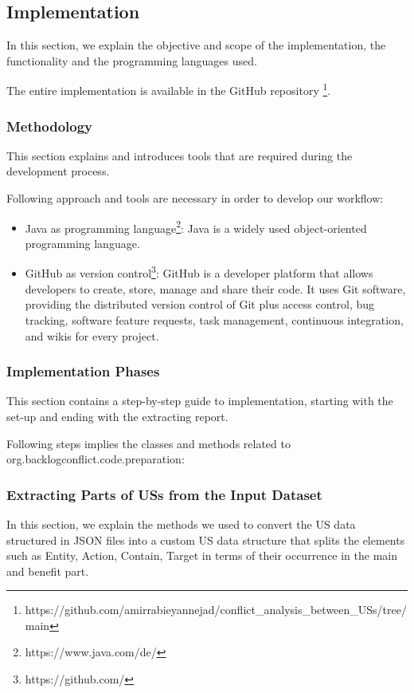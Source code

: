 \subsection{Implementation}\label{conflict_implementation}
In this section, we explain the objective and scope of the implementation, the functionality and the programming languages used.

The entire implementation is available in the GitHub repository \footnote{https://github.com/amirrabieyannejad/conflict\_analysis\_between\_USs/tree/main}.
\subsubsection*{Methodology}
This section explains and introduces tools that are required during the development process.

Following approach and tools are necessary in order to develop our workflow:
\begin{itemize}	
	\item Java as programming language\footnote{https://www.java.com/de/}: Java is a widely used object-oriented programming language.
	
	\item GitHub as version control\footnote{https://github.com/}: GitHub is a developer platform that allows developers to create, store, manage and share their code. It uses Git software, providing the distributed version control of Git plus access control, bug tracking, software feature requests, task management, continuous integration, and wikis for every project.
\end{itemize} 
\subsubsection*{Implementation Phases}\label{conflict_phases}
This section contains a step-by-step guide to implementation, starting with the set-up and ending with the extracting report.

Following steps implies the classes and methods related to org.backlogconflict.code.preparation:
\subsubsection*{Extracting Parts of USs from the Input Dataset}\label{conflict_step_json_transformer}
In this section, we explain the methods we used to convert the US data structured in JSON files into a custom US data structure that splits the elements such as Entity, Action, Contain, Target in terms of their occurrence in the main and benefit part. 
